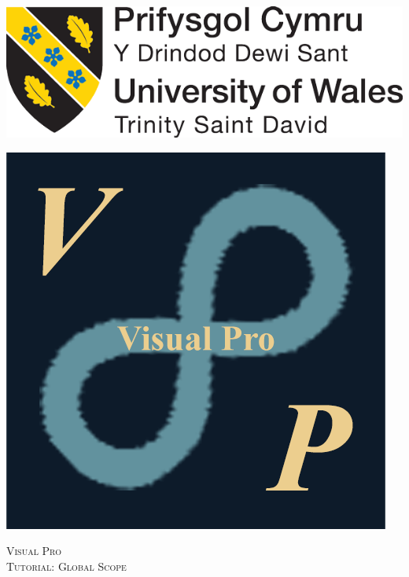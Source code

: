 \documentclass[10pt]{article}
\begin{document}
\begin{center}																		%
\newcommand{\HRule}{\rule{\linewidth}{0.5mm}}									%
\begin{minipage}{0.48\textwidth} \begin{flushleft}
\includegraphics[scale = 0.15]{Figures/Logo/UWTSD-Logo}
\end{flushleft}\end{minipage}
\begin{minipage}{0.48\textwidth} \begin{flushright}
\includegraphics[scale = 0.4]{Figures/Logo/VP-Logo-Large}
\end{flushright}\end{minipage}

\vspace*{-1.5cm}								%
\textsc{\huge Visual Pro\\ \vspace{5px} Tutorial: Global Scope}\\[1.5cm]	


\end{center}
\end{document}
